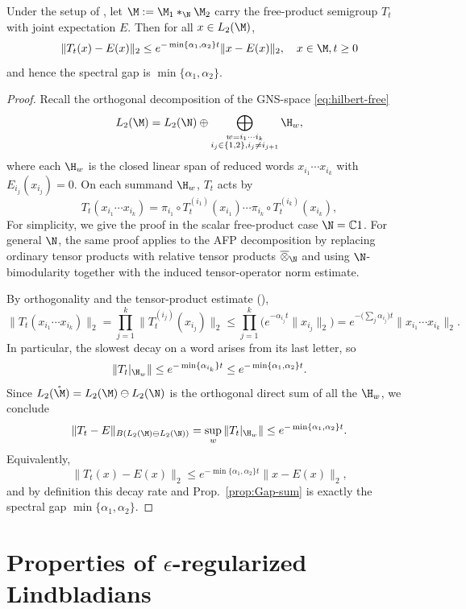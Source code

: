 \documentclass[sn-mathphys-num]{sn-jnl}
\begin{document}
\begin{cor}\label{cor:gap}
Under the setup of ,
let $\M:=\M_1*_\N\M_2$ carry the free-product semigroup $T_t$ \cite{boca_completely_1993} with joint expectation $E$.  Then for all $x\in L_2(\M)$,
\[
\|T_t(x)-E(x)\|_{2}
 \le
e^{-\min\{\alpha_1,\alpha_2\}t}  \|x-E(x)\|_{2}, \quad   x\in\M,t\ge0
\]
and hence the spectral gap is $\min\{\alpha_1,\alpha_2\}$.
\end{cor}
\begin{proof}
Recall the orthogonal decomposition of the GNS-space \eqref{eq:hilbert-free}
\[
L_2(\M)
 =
L_2(\N)
 \oplus
\bigoplus_{\substack{w=i_1\cdots i_k\\ i_j\in\{1,2\},  i_j\neq i_{j+1}}}
\H_w,
\]
where each $\H_w$ is the closed linear span of reduced words $x_{i_1}\cdots x_{i_k}$ with $E_{i_j}(x_{i_j})=0$.  On each summand $\H_w$, $T_t$ acts by
\[
T_t(x_{i_1}\cdots x_{i_k})
= \pi_{i_1}\circ T^{(i_1)}_t(x_{i_1}) \cdots \pi_{i_k}\circ T^{(i_k)}_t(x_{i_k}),
\]
For simplicity, we give the proof in the scalar free-product case
$\N=\mathbb C1$.
For general $\N$, the same proof applies to the AFP decomposition by replacing ordinary tensor products with relative tensor products $\overline{\otimes}_{\N}$ and using $\N$-bimodularity together with the induced tensor-operator norm estimate.

By orthogonality and the tensor-product estimate (),
\[
\|T_t(x_{i_1}\cdots x_{i_k})\|_2
 =
\prod_{j=1}^k\|T^{(i_j)}_t(x_{i_j})\|_2
 \le
\prod_{j=1}^k\bigl(e^{-\alpha_{i_j}t}\|x_{i_j}\|_2\bigr)
 =
e^{-\bigl(\sum_j\alpha_{i_j}\bigr)t}
\|x_{i_1}\cdots x_{i_k}\|_2.
\]
In particular, the slowest decay on a word arises from its last letter, so
\[
\|T_t|_{\H_w}\|
 \le
e^{-\min\{\alpha_{i_k}\}  t}
 \le
e^{-\min\{\alpha_1,\alpha_2\}  t}.
\]
Since $L_2(\mathring{\M})=L_2(\M)\ominus L_2(\N)$ is the orthogonal direct sum of all the $\H_w$, we conclude
\[
\|T_t - E\|_{B(L_2(\M)\ominus L_2(\N))}
 =
\sup_w\|T_t|_{\H_w}\|
 \le
e^{-\min\{\alpha_1,\alpha_2\}t}.
\]
Equivalently,
\[
\|T_t(x)-E(x)\|_2
 \le
e^{-\min\{\alpha_1,\alpha_2\}t}  \|x-E(x)\|_2,
\]
and by definition this decay rate and Prop.~\ref{prop:Gap-sum} is exactly the spectral gap $\min\{\alpha_1,\alpha_2\}$.
\end{proof}



\section{Properties of \texorpdfstring{$\epsilon$}{epsilon}-regularized Lindbladians}\label{app:regular}
\end{document}
